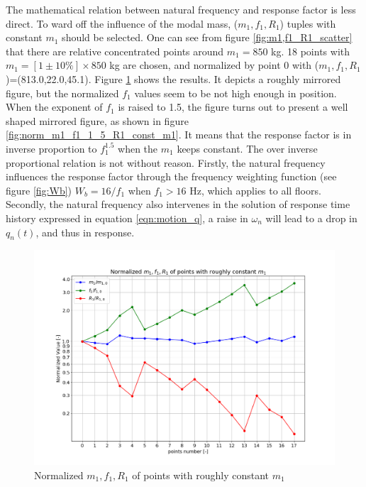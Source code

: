 The mathematical relation between natural frequency and response factor is less direct. To ward off the influence of the modal mass, ($m_1,f_1,R_1$) tuples with constant $m_1$ should be selected. One can see from figure \ref{fig:m1,f1_R1_scatter} that there are relative concentrated points around $m_1=850$ kg. 18 points with $m_1=[1\pm10\%]\times850$ kg are chosen, and normalized by point 0 with ($m_1,f_1,R_1$)=(813.0,22.0,45.1). Figure \ref{fig:norm_m1_f1_R1_const_m1} shows the results. It depicts a roughly mirrored figure, but the normalized $f_1$ values seem to be not high enough in position. When the exponent of $f_1$ is raised to 1.5, the figure turns out to present a well shaped mirrored figure, as shown in figure \ref{fig:norm_m1_f1_1_5_R1_const_m1}. It means that the response factor is in inverse proportion to $f_1^{1.5}$ when the $m_1$ keeps constant. The over inverse proportional relation is not without reason. Firstly, the natural frequency influences the response factor through the frequency weighting function (see figure \ref{fig:Wb}) $W_b=16/f_1$ when $f_1>16$ Hz, which applies to all floors. Secondly, the natural frequency also intervenes in the solution of response time history expressed in equation \ref{eqn:motion_q}, a raise in $\omega_n$ will lead to a drop in $q_n(t)$, and thus in response. 
\begin{figure}[H]
\centering
\includegraphics[width=.8\textwidth]{images/norm_m1_f1_R1_const_m1.png}
\caption{Normalized $m_1,f_1,R_1$ of points with roughly constant $m_1$}
\label{fig:norm_m1_f1_R1_const_m1}
\end{figure}

